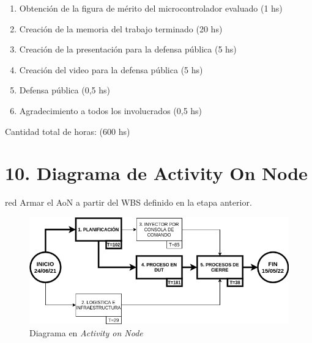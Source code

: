 \documentclass[
11pt, %
]{charter}
\begin{document}
\begin{enumerate}
\begin{enumerate}
		\item Obtención de la figura de mérito del microcontrolador evaluado (1 hs)
		\item Creación de la memoria del trabajo terminado (20 hs)
		\item Creación de la presentación para la defensa pública (5 hs)
		\item Creación del video para la defensa pública (5 hs)
		\item Defensa pública (0,5 hs)
		\item Agradecimiento a todos los involucrados (0,5 hs)
	\end{enumerate}
\end{enumerate}

Cantidad total de horas: (600 hs)

\section{10. Diagrama de Activity On Node}
\label{sec:AoN}

\begin{consigna}{red}
Armar el AoN a partir del WBS definido en la etapa anterior. 



\end{consigna}

\begin{figure}[htpb]
\centering 
\includegraphics[width=.8\textwidth]{./Figuras/AoN.png}
\caption{Diagrama en \textit{Activity on Node}}
\label{fig:AoN}
\end{figure}
\end{document}
